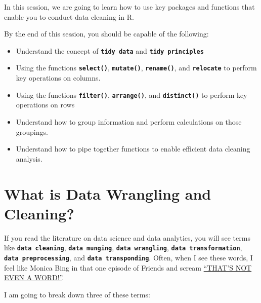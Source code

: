 \documentclass[
]{book}
\begin{document}
In this session, we are going to learn how to use key packages and functions that enable you to conduct data cleaning in R.

By the end of this session, you should be capable of the following:

\begin{itemize}
\item
  Understand the concept of \textbf{\texttt{tidy\ data}} and \textbf{\texttt{tidy\ principles}}
\item
  Using the functions \textbf{\texttt{select()}}, \textbf{\texttt{mutate()}}, \textbf{\texttt{rename()}}, and \textbf{\texttt{relocate}} to perform key operations on columns.
\item
  Using the functions \textbf{\texttt{filter()}}, \textbf{\texttt{arrange()}}, and \textbf{\texttt{distinct()}} to perform key operations on rows
\item
  Understand how to group information and perform calculations on those groupings.
\item
  Understand how to pipe together functions to enable efficient data cleaning analysis.
\end{itemize}

\hypertarget{what-is-data-wrangling-and-cleaning}{%
\section{\texorpdfstring{\textbf{What is Data Wrangling and Cleaning?}}{What is Data Wrangling and Cleaning?}}\label{what-is-data-wrangling-and-cleaning}}

If you read the literature on data science and data analytics, you will see terms like \textbf{\texttt{data\ cleaning}}, \textbf{\texttt{data\ munging}}, \textbf{\texttt{data\ wrangling}}, \textbf{\texttt{data\ transformation}}, \textbf{\texttt{data\ preprocessing}}, and \textbf{\texttt{data\ transponding}}. Often, when I see these words, I feel like Monica Bing in that one episode of Friends and scream \href{https://youtu.be/uYM1uQ7QrTc?si=ZPZp2h3CiruqHh-m\&t=93}{``THAT'S NOT EVEN A WORD!''}.

I am going to break down three of these terms:
\end{document}
